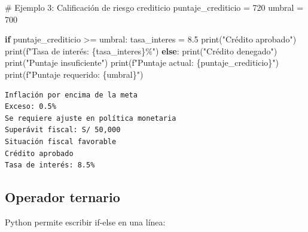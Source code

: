 \documentclass[
  doc,
  floatsintext,
  longtable,
  a4paper,
  nolmodern,
  notxfonts,
  notimes,
  12pt,
  colorlinks=true,linkcolor=blue,citecolor=blue,urlcolor=blue]{apa7}
\newenvironment{Shaded}{\begin{snugshade}}{\end{snugshade}}
\newcommand{\BuiltInTok}[1]{\textcolor[rgb]{0.00,0.23,0.31}{#1}}
\newcommand{\CommentTok}[1]{\textcolor[rgb]{0.37,0.37,0.37}{#1}}
\newcommand{\ControlFlowTok}[1]{\textcolor[rgb]{0.00,0.23,0.31}{\textbf{#1}}}
\newcommand{\DecValTok}[1]{\textcolor[rgb]{0.68,0.00,0.00}{#1}}
\newcommand{\FloatTok}[1]{\textcolor[rgb]{0.68,0.00,0.00}{#1}}
\newcommand{\NormalTok}[1]{\textcolor[rgb]{0.00,0.23,0.31}{#1}}
\newcommand{\OperatorTok}[1]{\textcolor[rgb]{0.37,0.37,0.37}{#1}}
\newcommand{\SpecialCharTok}[1]{\textcolor[rgb]{0.37,0.37,0.37}{#1}}
\newcommand{\SpecialStringTok}[1]{\textcolor[rgb]{0.13,0.47,0.30}{#1}}
\newcommand{\StringTok}[1]{\textcolor[rgb]{0.13,0.47,0.30}{#1}}
\begin{document}
\begin{Shaded}
\begin{Highlighting}[]
\CommentTok{\# Ejemplo 3: Calificación de riesgo crediticio}
\NormalTok{puntaje\_crediticio }\OperatorTok{=} \DecValTok{720}
\NormalTok{umbral }\OperatorTok{=} \DecValTok{700}

\ControlFlowTok{if}\NormalTok{ puntaje\_crediticio }\OperatorTok{\textgreater{}=}\NormalTok{ umbral:}
\NormalTok{    tasa\_interes }\OperatorTok{=} \FloatTok{8.5}
    \BuiltInTok{print}\NormalTok{(}\StringTok{"Crédito aprobado"}\NormalTok{)}
    \BuiltInTok{print}\NormalTok{(}\SpecialStringTok{f"Tasa de interés: }\SpecialCharTok{\{}\NormalTok{tasa\_interes}\SpecialCharTok{\}}\SpecialStringTok{\%"}\NormalTok{)}
\ControlFlowTok{else}\NormalTok{:}
    \BuiltInTok{print}\NormalTok{(}\StringTok{"Crédito denegado"}\NormalTok{)}
    \BuiltInTok{print}\NormalTok{(}\StringTok{"Puntaje insuficiente"}\NormalTok{)}
    \BuiltInTok{print}\NormalTok{(}\SpecialStringTok{f"Puntaje actual: }\SpecialCharTok{\{}\NormalTok{puntaje\_crediticio}\SpecialCharTok{\}}\SpecialStringTok{"}\NormalTok{)}
    \BuiltInTok{print}\NormalTok{(}\SpecialStringTok{f"Puntaje requerido: }\SpecialCharTok{\{}\NormalTok{umbral}\SpecialCharTok{\}}\SpecialStringTok{"}\NormalTok{)}
\end{Highlighting}
\end{Shaded}

\begin{verbatim}
Inflación por encima de la meta
Exceso: 0.5%
Se requiere ajuste en política monetaria
Superávit fiscal: S/ 50,000
Situación fiscal favorable
Crédito aprobado
Tasa de interés: 8.5%
\end{verbatim}

\subsection{Operador ternario}\label{operador-ternario}

Python permite escribir if-else en una línea:
\end{document}
